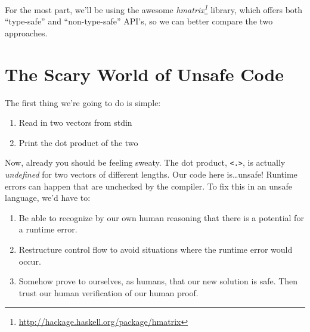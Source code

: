 \documentclass[]{article}
\newenvironment{Shaded}{}{}
\newcommand{\KeywordTok}[1]{\textcolor[rgb]{0.00,0.44,0.13}{\textbf{{#1}}}}
\newcommand{\DataTypeTok}[1]{\textcolor[rgb]{0.56,0.13,0.00}{{#1}}}
\newcommand{\OtherTok}[1]{\textcolor[rgb]{0.00,0.44,0.13}{{#1}}}
\newcommand{\FunctionTok}[1]{\textcolor[rgb]{0.02,0.16,0.49}{{#1}}}
\newcommand{\NormalTok}[1]{{#1}}
\renewcommand{\href}[2]{#2\footnote{\url{#1}}}
\begin{document}
For the most part, we'll be using the awesome
\emph{\href{http://hackage.haskell.org/package/hmatrix}{hmatrix}}
library, which offers both ``type-safe'' and ``non-type-safe'' API's, so
we can better compare the two approaches.

\section{The Scary World of Unsafe
Code}\label{the-scary-world-of-unsafe-code}

The first thing we're going to do is simple:

\begin{enumerate}
\def\labelenumi{\arabic{enumi}.}
\tightlist
\item
  Read in two vectors from stdin
\item
  Print the dot product of the two
\end{enumerate}

\begin{Shaded}
\end{Shaded}

Now, already you should be feeling sweaty. The dot product,
\texttt{\textless{}.\textgreater{}}, is actually \emph{undefined} for
two vectors of different lengths. Our code here is\ldots{}unsafe!
Runtime errors can happen that are unchecked by the compiler. To fix
this in an unsafe language, we'd have to:

\begin{enumerate}
\def\labelenumi{\arabic{enumi}.}
\tightlist
\item
  Be able to recognize by our own human reasoning that there is a
  potential for a runtime error.
\item
  Restructure control flow to avoid situations where the runtime error
  would occur.
\item
  Somehow prove to ourselves, as humans, that our new solution is safe.
  Then trust our human verification of our human proof.
\end{enumerate}
\end{document}
